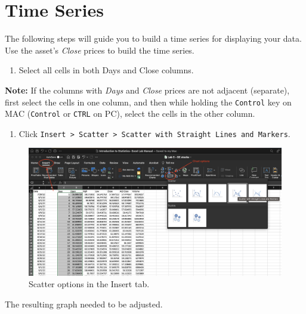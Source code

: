 \documentclass[
  12pt,
  letterpaper,
]{book}
\providecommand{\tightlist}{%
  \setlength{\itemsep}{0pt}\setlength{\parskip}{0pt}}
\begin{document}
\hypertarget{time-series-1}{%
\section{Time Series}\label{time-series-1}}

The following steps will guide you to build a time series for displaying your data. Use the asset's \emph{Close} prices to build the time series.

\begin{enumerate}
\def\labelenumi{\arabic{enumi}.}
\tightlist
\item
  Select all cells in both Days and Close columns.
\end{enumerate}

\textbf{Note:} If the columns with \emph{Days} and \emph{Close} prices are not adjacent (separate), first select the cells in one column, and then while holding the \texttt{Control} key on MAC (\texttt{Control} or \texttt{CTRL} on PC), select the cells in the other column.

\begin{enumerate}
\def\labelenumi{\arabic{enumi}.}
\setcounter{enumi}{1}
\tightlist
\item
  Click \texttt{Insert\ \textgreater{}\ Scatter\ \textgreater{}\ Scatter\ with\ Straight\ Lines\ and\ Markers}.
\end{enumerate}

\begin{figure}

{\centering \includegraphics[width=0.95\linewidth]{images/scatter-options} 

}

\caption{Scatter options in the Insert tab.}\label{fig:scatter-options}
\end{figure}

The resulting graph needed to be adjusted.
\end{document}
